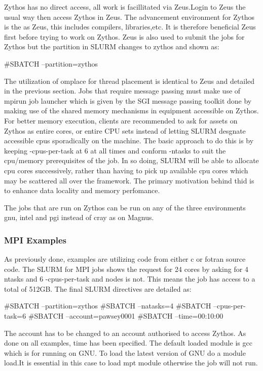\documentclass[journal]{IEEEtran}
\begin{document}
Zythos has no direct access, all work is facillitated via Zeus.Login to Zeus the usual way then access Zythos in Zeus.
The advancement environment for Zythos is the as Zeus, this includes compilers, libraries,etc. 
It is therefore beneficial Zeus first before trying to work on Zythos.
Zeus is also used to submit the jobs for Zythos but the partition in SLURM changes to zythos and shown as:

#SBATCH --partition=zythos

The utilization of omplace for thread placement is identical to Zeus and detailed in the previous section.
Jobs that require message passing must make use of mpirun job launcher which is given by the SGI message passing toolkit done by making use of the shared memory mechanisms in equipment accessible on Zythos.
For better memory execution, clients are recommended to ask for assets on Zythos as entire cores, or entire CPU sets instead of letting SLURM desgnate accessible cpus sporadically on the machine. 
The basic approach to do this is by keeping -cpus-per-task at 6 at all times and conform -ntasks to suit the cpu/memory prerequisites of the job.
In so doing, SLURM will be able to allocate cpu cores successively, rather than having to pick up available cpu cores which may be scattered all over the framework.
The primary motivation behind thid is to enhance data locality and memory perfomance.

The jobs that are run on Zythos can be run on any of the three environments gnu, intel and pgi instead of cray as on Magnus.



\subsubsection{MPI Examples}

As previously done, examples are utilizing code from either c or fotran source code.
The SLURM for MPI jobs shows the request for 24 cores by asking for 4 ntasks and 6 -cpus-per-task and nodes is not. 
This means the job has access to a total of 512GB.
The final SLURM directives are detailed as:

#SBATCH --partition=zythos
#SBATCH --natasks=4
#SBATCH --cpus-per-task=6
#SBATCH --account=pawsey0001
#SBATCH --time=00:10:00

The account has to be changed to an account authorised to access Zythos.
As done on all examples, time has been specified.
The default loaded module is gcc which is for running on GNU.
To load the latest version of GNU do a module load.It is essential in this case to load mpt module otherwise the job will not run.
\end{document}
